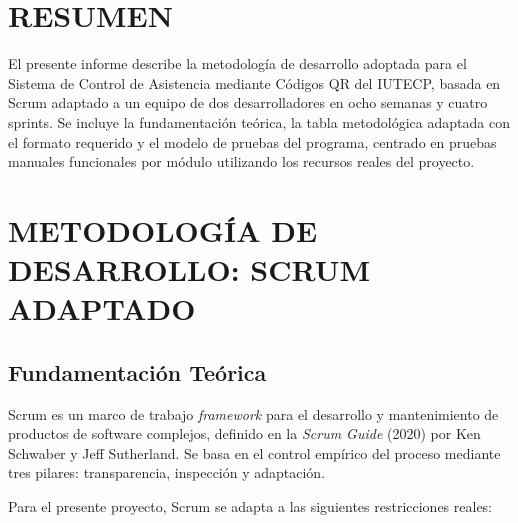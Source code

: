 \documentclass[12pt, letterpaper, oneside]{report}
\begin{document}
\tableofcontents
\newpage

\chapter*{RESUMEN}

El presente informe describe la metodolog\'ia de desarrollo adoptada para el Sistema de Control de Asistencia mediante C\'odigos QR del IUTECP, basada en Scrum adaptado a un equipo de dos desarrolladores en ocho semanas y cuatro sprints. Se incluye la fundamentaci\'on te\'orica, la tabla metodol\'ogica adaptada con el formato requerido y el modelo de pruebas del programa, centrado en pruebas manuales funcionales por m\'odulo utilizando los recursos reales del proyecto.

\newpage

\pagestyle{body}

\chapter{METODOLOG\'IA DE DESARROLLO: SCRUM ADAPTADO}

\section{Fundamentaci\'on Te\'orica}

Scrum es un marco de trabajo \textit{framework} para el desarrollo y mantenimiento de productos de software complejos, definido en la \textit{Scrum Guide} (2020) por Ken Schwaber y Jeff Sutherland. Se basa en el control emp\'irico del proceso mediante tres pilares: transparencia, inspecci\'on y adaptaci\'on.

Para el presente proyecto, Scrum se adapta a las siguientes restricciones reales:
\end{document}
